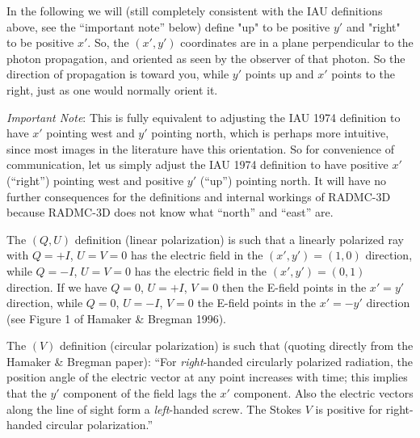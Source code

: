 \documentclass{report}
\begin{document}
In the following we will (still completely consistent with the IAU
definitions above, see the ``important note'' below) define "up" to be
positive $y'$ and "right" to be positive $x'$. So, the $(x',y')$ coordinates
are in a plane perpendicular to the photon propagation, and oriented as seen
by the observer of that photon. So the direction of propagation is toward
you, while $y'$ points up and $x'$ points to the right, just as one would
normally orient it.

{\em Important Note}: This is fully equivalent to adjusting the IAU 1974
definition to have $x'$ pointing west and $y'$ pointing north, which is
perhaps more intuitive, since most images in the literature have this
orientation. So for convenience of communication, let us simply adjust the
IAU 1974 definition to have positive $x'$ (``right'') pointing west and
positive $y'$ (``up'') pointing north.  It will have no further consequences
for the definitions and internal workings of RADMC-3D because RADMC-3D does
not know what ``north'' and ``east'' are.

The $(Q,U)$ definition (linear polarization) is such that a linearly
polarized ray with $Q=+I$, $U=V=0$ has the electric field in the
$(x',y')=(1,0)$ direction, while $Q=-I$, $U=V=0$ has the electric field in
the $(x',y')=(0,1)$ direction. If we have $Q=0$, $U=+I$, $V=0$ then the
E-field points in the $x'=y'$ direction, while $Q=0$, $U=-I$, $V=0$ the
E-field points in the $x'=-y'$ direction (see Figure 1 of Hamaker \& Bregman
1996).

The $(V)$ definition (circular polarization) is such that (quoting directly
from the Hamaker \& Bregman paper): ``For {\em right}-handed circularly
polarized radiation, the position angle of the electric vector at any
point increases with time; this implies that the $y'$ component of the field
lags the $x'$ component. Also the electric vectors along the line of sight
form a {\em left}-handed screw. The Stokes $V$ is positive for right-handed
circular polarization.''
\end{document}
